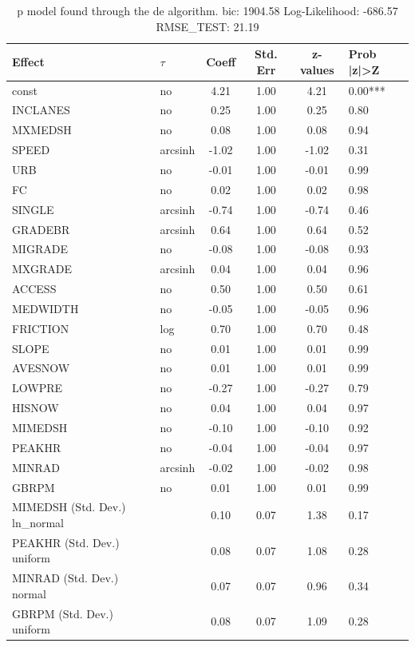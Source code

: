 \begin{table}
	\caption{p model found through the de algorithm. bic: 1904.58 Log-Likelihood: -686.57 RMSE_TEST: 21.19}
	\begin{center}
		\begin{tabular}{|l|l|c|c|c|l|}
			\hline
			Effect & $\tau$ & Coeff & Std. Err & z-values & Prob |z|>Z \\
			\hline
			const & no & 4.21 & 1.00 & 4.21 & 0.00*** \\
			\hline
			INCLANES & no & 0.25 & 1.00 & 0.25 & 0.80 \\
			\hline
			MXMEDSH & no & 0.08 & 1.00 & 0.08 & 0.94 \\
			\hline
			SPEED & arcsinh & -1.02 & 1.00 & -1.02 & 0.31 \\
			\hline
			URB & no & -0.01 & 1.00 & -0.01 & 0.99 \\
			\hline
			FC & no & 0.02 & 1.00 & 0.02 & 0.98 \\
			\hline
			SINGLE & arcsinh & -0.74 & 1.00 & -0.74 & 0.46 \\
			\hline
			GRADEBR & arcsinh & 0.64 & 1.00 & 0.64 & 0.52 \\
			\hline
			MIGRADE & no & -0.08 & 1.00 & -0.08 & 0.93 \\
			\hline
			MXGRADE & arcsinh & 0.04 & 1.00 & 0.04 & 0.96 \\
			\hline
			ACCESS & no & 0.50 & 1.00 & 0.50 & 0.61 \\
			\hline
			MEDWIDTH & no & -0.05 & 1.00 & -0.05 & 0.96 \\
			\hline
			FRICTION & log & 0.70 & 1.00 & 0.70 & 0.48 \\
			\hline
			SLOPE & no & 0.01 & 1.00 & 0.01 & 0.99 \\
			\hline
			AVESNOW & no & 0.01 & 1.00 & 0.01 & 0.99 \\
			\hline
			LOWPRE & no & -0.27 & 1.00 & -0.27 & 0.79 \\
			\hline
			HISNOW & no & 0.04 & 1.00 & 0.04 & 0.97 \\
			\hline
			MIMEDSH & no & -0.10 & 1.00 & -0.10 & 0.92 \\
			\hline
			PEAKHR & no & -0.04 & 1.00 & -0.04 & 0.97 \\
			\hline
			MINRAD & arcsinh & -0.02 & 1.00 & -0.02 & 0.98 \\
			\hline
			GBRPM & no & 0.01 & 1.00 & 0.01 & 0.99 \\
			\hline
			MIMEDSH (Std. Dev.) ln_normal &  & 0.10 & 0.07 & 1.38 & 0.17 \\
			\hline
			PEAKHR (Std. Dev.) uniform &  & 0.08 & 0.07 & 1.08 & 0.28 \\
			\hline
			MINRAD (Std. Dev.) normal &  & 0.07 & 0.07 & 0.96 & 0.34 \\
			\hline
			GBRPM (Std. Dev.) uniform &  & 0.08 & 0.07 & 1.09 & 0.28 \\
			\hline
		\end{tabular}
	\end{center}
\end{table}